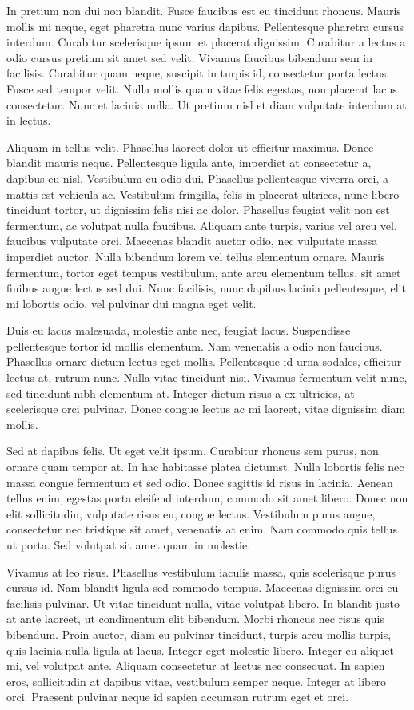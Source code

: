 In pretium non dui non blandit. Fusce faucibus est eu tincidunt rhoncus. Mauris
mollis mi neque, eget pharetra nunc varius dapibus. Pellentesque pharetra
cursus interdum. Curabitur scelerisque ipsum et placerat dignissim. Curabitur a
lectus a odio cursus pretium sit amet sed velit. Vivamus faucibus bibendum sem
in facilisis. Curabitur quam neque, suscipit in turpis id, consectetur porta
lectus. Fusce sed tempor velit. Nulla mollis quam vitae felis egestas, non
placerat lacus consectetur. Nunc et lacinia nulla. Ut pretium nisl et diam
vulputate interdum at in lectus.

Aliquam in tellus velit. Phasellus laoreet dolor ut efficitur maximus. Donec
blandit mauris neque. Pellentesque ligula ante, imperdiet at consectetur a,
dapibus eu nisl. Vestibulum eu odio dui. Phasellus pellentesque viverra orci, a
mattis est vehicula ac. Vestibulum fringilla, felis in placerat ultrices, nunc
libero tincidunt tortor, ut dignissim felis nisi ac dolor. Phasellus feugiat
velit non est fermentum, ac volutpat nulla faucibus. Aliquam ante turpis,
varius vel arcu vel, faucibus vulputate orci. Maecenas blandit auctor odio, nec
vulputate massa imperdiet auctor. Nulla bibendum lorem vel tellus elementum
ornare. Mauris fermentum, tortor eget tempus vestibulum, ante arcu elementum
tellus, sit amet finibus augue lectus sed dui. Nunc facilisis, nunc dapibus
lacinia pellentesque, elit mi lobortis odio, vel pulvinar dui magna eget velit.

Duis eu lacus malesuada, molestie ante nec, feugiat lacus. Suspendisse
pellentesque tortor id mollis elementum. Nam venenatis a odio non faucibus.
Phasellus ornare dictum lectus eget mollis. Pellentesque id urna sodales,
efficitur lectus at, rutrum nunc. Nulla vitae tincidunt nisi. Vivamus fermentum
velit nunc, sed tincidunt nibh elementum at. Integer dictum risus a ex
ultricies, at scelerisque orci pulvinar. Donec congue lectus ac mi laoreet,
vitae dignissim diam mollis.

Sed at dapibus felis. Ut eget velit ipsum. Curabitur rhoncus sem purus, non
ornare quam tempor at. In hac habitasse platea dictumst. Nulla lobortis felis
nec massa congue fermentum et sed odio. Donec sagittis id risus in lacinia.
Aenean tellus enim, egestas porta eleifend interdum, commodo sit amet libero.
Donec non elit sollicitudin, vulputate risus eu, congue lectus. Vestibulum
purus augue, consectetur nec tristique sit amet, venenatis at enim. Nam commodo
quis tellus ut porta. Sed volutpat sit amet quam in molestie.

Vivamus at leo risus. Phasellus vestibulum iaculis massa, quis scelerisque
purus cursus id. Nam blandit ligula sed commodo tempus. Maecenas dignissim orci
eu facilisis pulvinar. Ut vitae tincidunt nulla, vitae volutpat libero. In
blandit justo at ante laoreet, ut condimentum elit bibendum. Morbi rhoncus nec
risus quis bibendum. Proin auctor, diam eu pulvinar tincidunt, turpis arcu
mollis turpis, quis lacinia nulla ligula at lacus. Integer eget molestie
libero. Integer eu aliquet mi, vel volutpat ante. Aliquam consectetur at lectus
nec consequat. In sapien eros, sollicitudin at dapibus vitae, vestibulum semper
neque. Integer at libero orci. Praesent pulvinar neque id sapien accumsan
rutrum eget et orci.

